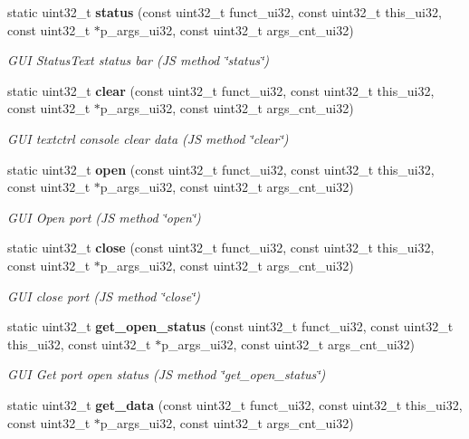 \begin{DoxyCompactItemize}
static uint32\+\_\+t \textbf{ status} (const uint32\+\_\+t funct\+\_\+ui32, const uint32\+\_\+t this\+\_\+ui32, const uint32\+\_\+t $\ast$p\+\_\+args\+\_\+ui32, const uint32\+\_\+t args\+\_\+cnt\+\_\+ui32)
\begin{DoxyCompactList}\small\item\em G\+UI Status\+Text status bar (JS method \char`\"{}status\char`\"{}) \end{DoxyCompactList}\item 
static uint32\+\_\+t \textbf{ clear} (const uint32\+\_\+t funct\+\_\+ui32, const uint32\+\_\+t this\+\_\+ui32, const uint32\+\_\+t $\ast$p\+\_\+args\+\_\+ui32, const uint32\+\_\+t args\+\_\+cnt\+\_\+ui32)
\begin{DoxyCompactList}\small\item\em G\+UI textctrl console clear data (JS method \char`\"{}clear\char`\"{}) \end{DoxyCompactList}\item 
static uint32\+\_\+t \textbf{ open} (const uint32\+\_\+t funct\+\_\+ui32, const uint32\+\_\+t this\+\_\+ui32, const uint32\+\_\+t $\ast$p\+\_\+args\+\_\+ui32, const uint32\+\_\+t args\+\_\+cnt\+\_\+ui32)
\begin{DoxyCompactList}\small\item\em G\+UI Open port (JS method \char`\"{}open\char`\"{}) \end{DoxyCompactList}\item 
static uint32\+\_\+t \textbf{ close} (const uint32\+\_\+t funct\+\_\+ui32, const uint32\+\_\+t this\+\_\+ui32, const uint32\+\_\+t $\ast$p\+\_\+args\+\_\+ui32, const uint32\+\_\+t args\+\_\+cnt\+\_\+ui32)
\begin{DoxyCompactList}\small\item\em G\+UI close port (JS method \char`\"{}close\char`\"{}) \end{DoxyCompactList}\item 
static uint32\+\_\+t \textbf{ get\+\_\+open\+\_\+status} (const uint32\+\_\+t funct\+\_\+ui32, const uint32\+\_\+t this\+\_\+ui32, const uint32\+\_\+t $\ast$p\+\_\+args\+\_\+ui32, const uint32\+\_\+t args\+\_\+cnt\+\_\+ui32)
\begin{DoxyCompactList}\small\item\em G\+UI Get port open status (JS method \char`\"{}get\+\_\+open\+\_\+status\char`\"{}) \end{DoxyCompactList}\item 
static uint32\+\_\+t \textbf{ get\+\_\+data} (const uint32\+\_\+t funct\+\_\+ui32, const uint32\+\_\+t this\+\_\+ui32, const uint32\+\_\+t $\ast$p\+\_\+args\+\_\+ui32, const uint32\+\_\+t args\+\_\+cnt\+\_\+ui32)

\end{DoxyCompactItemize}
